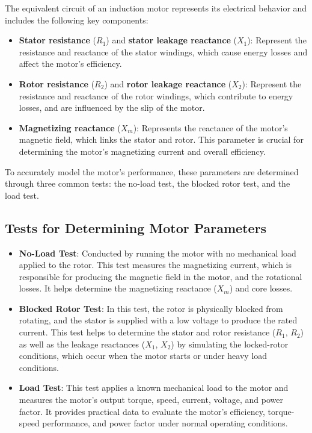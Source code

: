 \documentclass[12pt,a4paper]{report}
\begin{document}
The equivalent circuit of an induction motor represents its electrical behavior and includes the following key components:
\begin{itemize}
    \item \textbf{Stator resistance} ($R_1$) and \textbf{stator leakage reactance} ($X_1$): Represent the resistance and reactance of the stator windings, which cause energy losses and affect the motor’s efficiency.
    \item \textbf{Rotor resistance} ($R_2$) and \textbf{rotor leakage reactance} ($X_2$): Represent the resistance and reactance of the rotor windings, which contribute to energy losses, and are influenced by the slip of the motor.
    \item \textbf{Magnetizing reactance} ($X_m$): Represents the reactance of the motor’s magnetic field, which links the stator and rotor. This parameter is crucial for determining the motor's magnetizing current and overall efficiency.
\end{itemize}

To accurately model the motor's performance, these parameters are determined through three common tests: the no-load test, the blocked rotor test, and the load test.

\subsection{Tests for Determining Motor Parameters}

\begin{itemize}
    \item \textbf{No-Load Test}: Conducted by running the motor with no mechanical load applied to the rotor. This test measures the magnetizing current, which is responsible for producing the magnetic field in the motor, and the rotational losses. It helps determine the magnetizing reactance ($X_m$) and core losses.
    
    \item \textbf{Blocked Rotor Test}: In this test, the rotor is physically blocked from rotating, and the stator is supplied with a low voltage to produce the rated current. This test helps to determine the stator and rotor resistance ($R_1$, $R_2$) as well as the leakage reactances ($X_1$, $X_2$) by simulating the locked-rotor conditions, which occur when the motor starts or under heavy load conditions.
    
    \item \textbf{Load Test}: This test applies a known mechanical load to the motor and measures the motor’s output torque, speed, current, voltage, and power factor. It provides practical data to evaluate the motor’s efficiency, torque-speed performance, and power factor under normal operating conditions.
\end{itemize}
\end{document}
